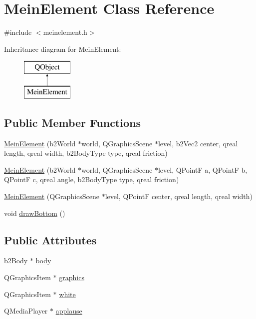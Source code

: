 \hypertarget{class_mein_element}{}\section{Mein\+Element Class Reference}
\label{class_mein_element}


{\ttfamily \#include $<$meinelement.\+h$>$}

Inheritance diagram for Mein\+Element\+:\begin{figure}[H]
\begin{center}
\leavevmode
\includegraphics[height=2.000000cm]{class_mein_element}
\end{center}
\end{figure}
\subsection*{Public Member Functions}
\begin{DoxyCompactItemize}
\item 
\hyperlink{class_mein_element_a4a192d36a37deaaa20fb3aeefc7a2e12}{Mein\+Element} (b2\+World $\ast$world, Q\+Graphics\+Scene $\ast$level, b2\+Vec2 center, qreal length, qreal width, b2\+Body\+Type type, qreal friction)
\item 
\hyperlink{class_mein_element_a9ea5c3ad044645efd41cb6f495e61072}{Mein\+Element} (b2\+World $\ast$world, Q\+Graphics\+Scene $\ast$level, Q\+PointF a, Q\+PointF b, Q\+PointF c, qreal angle, b2\+Body\+Type type, qreal friction)
\item 
\hyperlink{class_mein_element_a0176c160758487042b6fca43d5141f8d}{Mein\+Element} (Q\+Graphics\+Scene $\ast$level, Q\+PointF center, qreal length, qreal width)
\item 
void \hyperlink{class_mein_element_a711d5166f243d41f240990a3bf0bceff}{draw\+Bottom} ()
\end{DoxyCompactItemize}
\subsection*{Public Attributes}
\begin{DoxyCompactItemize}
\item 
b2\+Body $\ast$ \hyperlink{class_mein_element_a05117e05589fc0a4b1e144511fbd3eec}{body}
\item 
Q\+Graphics\+Item $\ast$ \hyperlink{class_mein_element_a6d0a318f2e37f3633f7cf6fc20e83531}{graphics}
\item 
Q\+Graphics\+Item $\ast$ \hyperlink{class_mein_element_a4811ea6a6c50dfad16c39bbaa9a758b8}{white}
\item 
Q\+Media\+Player $\ast$ \hyperlink{class_mein_element_a04019be8ecb452cf4ee984efed24e9e1}{applause}
\end{DoxyCompactItemize}


